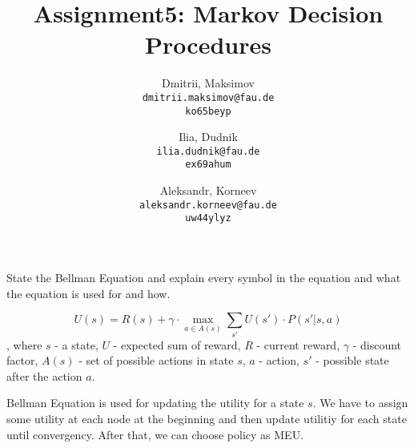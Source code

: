 \documentclass{homework}
\title{Assignment5: Markov Decision Procedures}
\author{
  Dmitrii, Maksimov\\
  \texttt{dmitrii.maksimov@fau.de} \\
  \texttt{ko65beyp}
  \and
  Ilia, Dudnik\\
  \texttt{ilia.dudnik@fau.de}\\
  \texttt{ex69ahum}
  \and
  Aleksandr, Korneev\\
  \texttt{aleksandr.korneev@fau.de}\\
  \texttt{uw44ylyz}
}
\begin{document}
\maketitle

State the Bellman Equation and explain every symbol in the equation and what the equation is used for and how.

\[U(s)=R(s) + \gamma \cdot \max_{a \in A(s)} \sum_{s'}U(s')\cdot P(s'|s, a)\], where $s$ - a state, $U$ - expected sum of reward,  $R$ - current reward, $\gamma$ - discount factor, $A(s)$ - set of possible actions in state $s$, $a$ - action, $s'$ - possible state after the action $a$.

Bellman Equation is used for updating the utility for a state $s$. We have to assign some utility at each node at the beginning and then update utilitiy for each state until convergency.  After that, we can choose policy as MEU.
\end{document}
